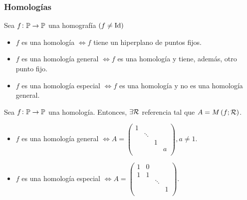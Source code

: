 \subsubsection{Homologías}

\begin{defi}
    Sea $f \colon \mathbb{P} \to \mathbb{P}$ una homografía $\left( f \neq \operatorname{Id} \right)$
    \begin{itemize}
        \item $f$ es una homología $\iff f$ tiene un hiperplano de puntos fijos.
        \item $f$ es una homología general $\iff f$ es una homología y tiene, además, otro punto fijo.
        \item $f$ es una homología especial $\iff f$ es una homología y no es una homología general.
    \end{itemize}
\end{defi}

\begin{prop}
    Sea $f \colon \mathbb{P} \to \mathbb{P}$ una homología. Entonces, $\exists \mathcal{R}$ referencia tal que $A=M\left( f ; \mathcal{R} \right)$.
    \begin{itemize}
        \item $f$ es una homología general $ \iff A=
            \begin{pmatrix}
                1 & & & \\
                & \ddots & & \\
                & & 1 & \\
                & & & a \\
            \end{pmatrix}, a \neq 1.$
        \item $f$ es una homología especial $ \iff A=
            \begin{pmatrix}
                1 & 0 & & \\
                1 & 1 & & \\
                & & \ddots &  \\
                & & & 1 \\
            \end{pmatrix}.$
    \end{itemize}
\end{prop}

